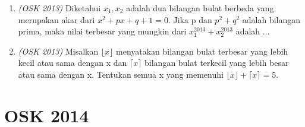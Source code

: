 \begin{enumerate}
	\item \textit{(OSK 2013)} Diketahui $x_1, x_2$ adalah dua bilangan bulat berbeda yang merupakan akar dari $x^2 + px + q + 1 = 0$. Jika p dan $p^2 + q^2$ adalah bilangan prima, maka nilai terbesar yang mungkin dari $x_1^{2013} + x_2^{2013}$ adalah $\dots$
	
	\item \textit{(OSK 2013)} Misalkan $\lfloor x \rfloor$ menyatakan bilangan bulat terbesar yang lebih kecil atau sama dengan x dan $\lceil x \rceil$ bilangan bulat terkecil yang lebih besar atau sama dengan x. Tentukan semua x yang memenuhi $\lfloor x \rfloor + \lceil x \rceil = 5$.
	
\end{enumerate}
\newpage

\section{OSK 2014}

